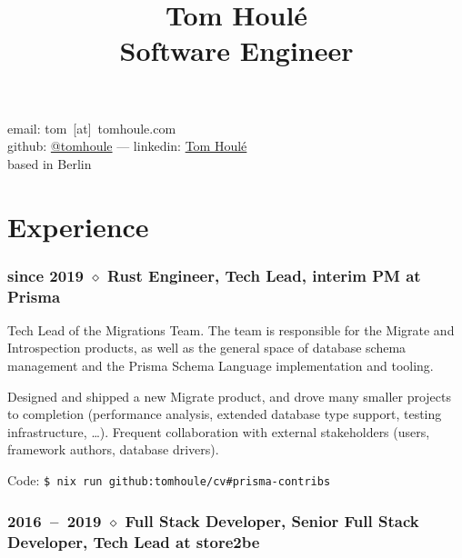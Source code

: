\documentclass[10pt]{article}
\date{}
\title{Tom Houlé \\ Software Engineer}
\author{}
\newcommand{\setparskip}{\setlength{\parskip}{.3em}}
\begin{document}
\maketitle

\vspace{-14mm}

\begin{center}
email: tom~[at]~tomhoule.com \\
github: \href{https://github.com/tomhoule}{@tomhoule}  --- linkedin: \href{https://www.linkedin.com/in/tom-houl\%C3\%A9-4398135a/}{Tom Houlé} \\
based in Berlin
\end{center}

\vspace{10mm}

\begin{minipage}[t]{0.54\textwidth}
  \setparskip

  \section*{Experience}

  \subsubsection*{since 2019 $\diamond$ Rust Engineer, Tech Lead, interim PM at Prisma}

    \vspace{-0.8em}

    Tech Lead of the Migrations Team. The team is responsible for the Migrate
    and Introspection products, as well as the general space of database schema
    management and the Prisma Schema Language implementation and tooling.

    Designed and shipped a new Migrate product, and drove many smaller projects to completion (performance analysis, extended database type support, testing infrastructure, …). Frequent collaboration with external stakeholders (users, framework authors, database drivers).

    Code: \texttt{\$ nix run github:tomhoule/cv\#prisma-contribs}

    \vspace{-0.5em}

    \subsubsection*{2016~--~2019 $\diamond$ Full Stack Developer, Senior Full Stack Developer, Tech Lead at store2be}


\end{minipage}
\end{document}
